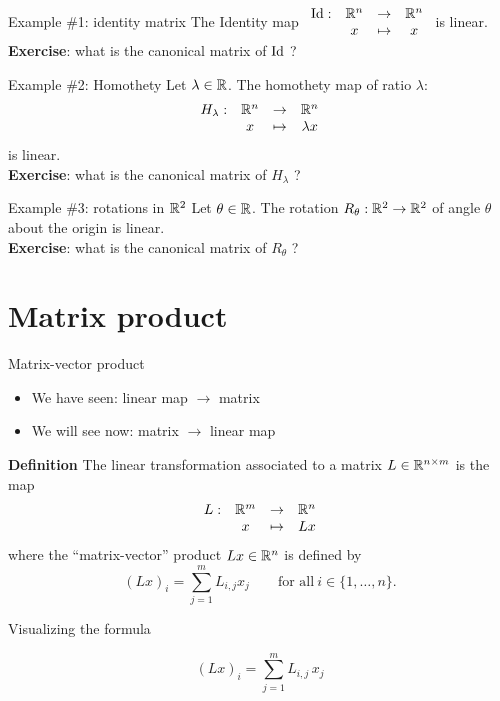 \documentclass{beamer}
\begin{document}
\begin{frame}[t]{Example \#1: identity matrix}
		The Identity map \quad $\displaystyle
			\begin{array}{cccc}
				{{\rm Id}}: & \mathbb{R}^n & \to & \mathbb{R}^n \\
				   & x & \mapsto & x
			\end{array}
			$
			\quad is linear.
			\\
			\vspace{0.3cm}
			\textbf{Exercise}: what is the canonical matrix of ${{\rm Id}}$ ?
\end{frame}
\begin{frame}[t]{Example \#2: Homothety}
	Let $\lambda \in \mathbb{R}$.
		The homothety map of ratio $\lambda$: 
		 $$
			\begin{array}{cccc}
				H_{\lambda}: & \mathbb{R}^n & \to & \mathbb{R}^n \\
				   & x & \mapsto & \lambda x
			\end{array}
			$$
			is linear.
			\\
			\vspace{0.3cm}
			\textbf{Exercise}: what is the canonical matrix of $H_{\lambda}$ ?
\end{frame}
\begin{frame}[t]{Example \#3: rotations in $\mathbb{R}^2$}
	Let $\theta \in \mathbb{R}$.
	The rotation $R_{\theta}: \mathbb{R}^2 \to \mathbb{R}^2$ of angle $\theta$ about the origin is linear.
			\\
			\vspace{0.3cm}
			\textbf{Exercise}: what is the canonical matrix of $R_{\theta}$ ?
\end{frame}

\section{Matrix product}

\begin{frame}[t]{Matrix-vector product}
	\begin{itemize}
		\item We have seen: \quad linear map $\to$ matrix
		\item We will see now: \quad matrix $\to$ linear map
	\end{itemize}

\begin{block}{\bf Definition}
	The linear transformation associated to a matrix $L \in \mathbb{R}^{n \times m}$ is the map
	$$
	\begin{array}{cccc}
		L:& \mathbb{R}^m & \to & \mathbb{R}^n \\
		  & x & \mapsto & Lx
	\end{array}
	$$
	where the ``matrix-vector'' product $Lx \in \mathbb{R}^n$ is defined by
	$$
	(Lx)_i = \sum_{j=1}^m L_{i,j} x_j \qquad \text{for all} \ i \in \{1, \dots, n\}.
	$$
\end{block}
\end{frame}
\begin{frame}[t]{Visualizing the formula}
	\vspace{-0.8cm}
	\begin{exampleblock}{}
	$$
	(Lx)_i = \sum_{j=1}^m L_{i,j} \, x_j
	$$
\end{exampleblock}
\end{frame}
\end{document}

